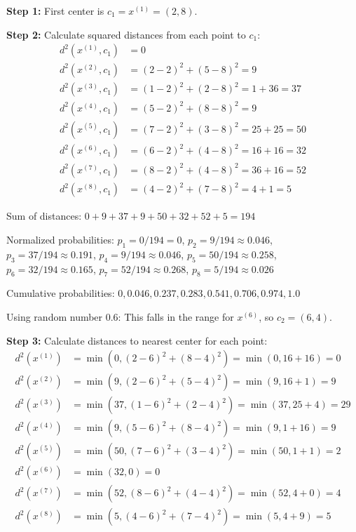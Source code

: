 \textbf{Step 1:} First center is $c_1 = x^{(1)} = (2,8)$.

\textbf{Step 2:} Calculate squared distances from each point to $c_1$:
\begin{align*}
d^2(x^{(1)}, c_1) &= 0\\
d^2(x^{(2)}, c_1) &= (2-2)^2 + (5-8)^2 = 9\\
d^2(x^{(3)}, c_1) &= (1-2)^2 + (2-8)^2 = 1 + 36 = 37\\
d^2(x^{(4)}, c_1) &= (5-2)^2 + (8-8)^2 = 9\\
d^2(x^{(5)}, c_1) &= (7-2)^2 + (3-8)^2 = 25 + 25 = 50\\
d^2(x^{(6)}, c_1) &= (6-2)^2 + (4-8)^2 = 16 + 16 = 32\\
d^2(x^{(7)}, c_1) &= (8-2)^2 + (4-8)^2 = 36 + 16 = 52\\
d^2(x^{(8)}, c_1) &= (4-2)^2 + (7-8)^2 = 4 + 1 = 5
\end{align*}

Sum of distances: $0 + 9 + 37 + 9 + 50 + 32 + 52 + 5 = 194$

Normalized probabilities:
$p_1 = 0/194 = 0$, $p_2 = 9/194 \approx 0.046$, $p_3 = 37/194 \approx 0.191$, $p_4 = 9/194 \approx 0.046$,
$p_5 = 50/194 \approx 0.258$, $p_6 = 32/194 \approx 0.165$, $p_7 = 52/194 \approx 0.268$, $p_8 = 5/194 \approx 0.026$

Cumulative probabilities: $0, 0.046, 0.237, 0.283, 0.541, 0.706, 0.974, 1.0$

Using random number 0.6: This falls in the range for $x^{(6)}$, so $c_2 = (6,4)$.

\textbf{Step 3:} Calculate distances to nearest center for each point:
\begin{align*}
d^2(x^{(1)}) &= \min(0, (2-6)^2 + (8-4)^2) = \min(0, 16 + 16) = 0\\
d^2(x^{(2)}) &= \min(9, (2-6)^2 + (5-4)^2) = \min(9, 16 + 1) = 9\\
d^2(x^{(3)}) &= \min(37, (1-6)^2 + (2-4)^2) = \min(37, 25 + 4) = 29\\
d^2(x^{(4)}) &= \min(9, (5-6)^2 + (8-4)^2) = \min(9, 1 + 16) = 9\\
d^2(x^{(5)}) &= \min(50, (7-6)^2 + (3-4)^2) = \min(50, 1 + 1) = 2\\
d^2(x^{(6)}) &= \min(32, 0) = 0\\
d^2(x^{(7)}) &= \min(52, (8-6)^2 + (4-4)^2) = \min(52, 4 + 0) = 4\\
d^2(x^{(8)}) &= \min(5, (4-6)^2 + (7-4)^2) = \min(5, 4 + 9) = 5
\end{align*}

